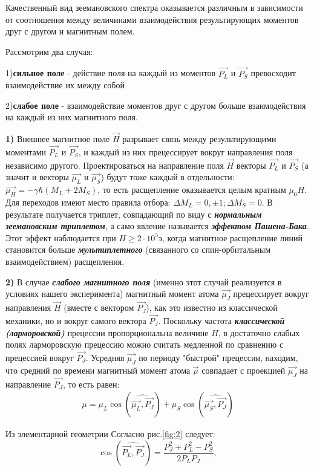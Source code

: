 Качественный вид зеемановского спектра оказывается различным в зависимости от соотношения между величинами взаимодействия результирующих моментов друг с другом и магнитным полем.

Рассмотрим два случая:

1)\textbf{сильное поле} - действие поля на каждый из моментов $\vec{P_L}$ и $\vec{P_S}$ превосходит взаимодействие их между собой

2)\textbf{слабое поле} - взаимодействие моментов друг с другом больше взаимодействия на каждый из них магнитного поля.

\textbf{1)} Внешнее магнитное поле $\vec{H}$ разрывает связь между результирующими моментами $\vec{P_L}$ и $\vec{P_S}$, и каждый из них прецессирует вокруг направления поля независимо другого. Проектироваться на направление поля $\vec{H}$ векторы $\vec{P_L}$ и $\vec{P_S}$ (а значит и векторы $\vec{\mu_L}$ и $\vec{\mu_S}$) будут тоже каждый в отдельности: $\vec{\mu_H}=-\gamma \hbar(M_L+2M_S)$, то есть расщепление оказывается целым кратным $\mu_0 H$. Для переходов имеют место правила отбора: $\Delta M_L=0,\pm 1; \Delta M_S=0.$ В результате получается триплет, совпадающий по виду с {\itshape\textbf{нормальным зеемановским триплетом}}, а само явление называется {\itshape\textbf{эффектом Пашена-Бака}}. Этот эффект наблюдается при $H\geq 2\cdot10^5 \text{э}$, когда магнитное расщепление линий становится больше {\itshape\textbf{мультиплетного}} (связанного со спин-орбитальным взаимодействием) расщепления.

\textbf{2)} В случае {\itshape\textbf{слабого магнитного поля}} (именно этот случай реализуется в условиях нашего эксперимента) магнитный момент атома $\vec{\mu_J}$ прецессирует вокруг направления $\vec{H}$ (вместе с вектором $\vec{P_J}$), как это известно из классической механики, но и вокруг самого вектора $\vec{P_J}$. Поскольку частота {\itshape\textbf{классической (ларморовской)}} прецессии пропорциональна величине $H$, в достаточно слабых полях ларморовскую прецессию можно считать медленной по сравнению с прецессией вокруг $\vec{P_J}$. Усредняя $\vec{\mu_J}$ по периоду "быстрой" прецессии, находим, что средний по времени магнитный момент атома $\vec{\mu}$ совпадает с проекцией $\vec{\mu_J}$ на направление $\vec{P_J}$, то есть равен: 
\begin{gather} 
\label{eq:18} 
\mu=\mu_L \cos(\widehat{\vec{\mu_L},\vec{P_J}})+\mu_S \cos(\widehat{\vec{\mu_S},\vec{P_J}})
\end{gather}

Из элементарной геометрии Согласно рис.\ref{fig:2} следует:
\begin{equation} 
\label{eq:19a} 
\cos(\widehat{\vec{P_L},\vec{P_J}})=\frac{P_J^2+P_L^2-P_S^2}{2P_L P_J},
\end{equation}

